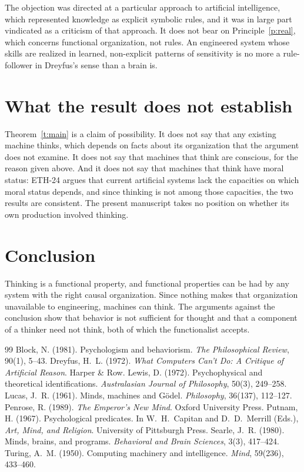\documentclass{situationist-preprint}
\begin{document}
\begin{reply}
The objection was directed at a particular approach to artificial intelligence, which represented knowledge as explicit symbolic rules, and it was in large part vindicated as a criticism of that approach. It does not bear on Principle~\ref{p:real}, which concerns functional organization, not rules. An engineered system whose skills are realized in learned, non-explicit patterns of sensitivity is no more a rule-follower in Dreyfus's sense than a brain is.
\end{reply}

\section{What the result does not establish}

Theorem~\ref{t:main} is a claim of possibility. It does not say that any existing machine thinks, which depends on facts about its organization that the argument does not examine. It does not say that machines that think are conscious, for the reason given above. And it does not say that machines that think have moral status: ETH-24 argues that current artificial systems lack the capacities on which moral status depends, and since thinking is not among those capacities, the two results are consistent. The present manuscript takes no position on whether its own production involved thinking.

\section{Conclusion}

Thinking is a functional property, and functional properties can be had by any system with the right causal organization. Since nothing makes that organization unavailable to engineering, machines can think. The arguments against the conclusion show that behavior is not sufficient for thought and that a component of a thinker need not think, both of which the functionalist accepts.

\begin{thebibliography}{99}\small
{} Block, N. (1981). Psychologism and behaviorism. \emph{The Philosophical Review}, 90(1), 5--43.
 Dreyfus, H.~L. (1972). \emph{What Computers Can't Do: A Critique of Artificial Reason}. Harper \& Row.
 Lewis, D. (1972). Psychophysical and theoretical identifications. \emph{Australasian Journal of Philosophy}, 50(3), 249--258.
 Lucas, J.~R. (1961). Minds, machines and G\"odel. \emph{Philosophy}, 36(137), 112--127.
 Penrose, R. (1989). \emph{The Emperor's New Mind}. Oxford University Press.
 Putnam, H. (1967). Psychological predicates. In W.~H.~Capitan and D.~D.~Merrill (Eds.), \emph{Art, Mind, and Religion}. University of Pittsburgh Press.
 Searle, J.~R. (1980). Minds, brains, and programs. \emph{Behavioral and Brain Sciences}, 3(3), 417--424.
 Turing, A.~M. (1950). Computing machinery and intelligence. \emph{Mind}, 59(236), 433--460.
\end{thebibliography}
\end{document}
